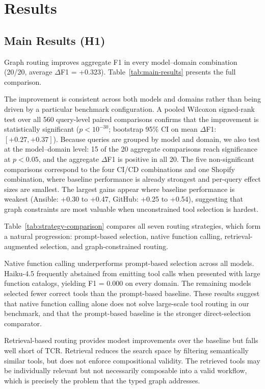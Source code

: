 \section{Results}
\label{sec:results}

\subsection{Main Results (H1)}
\label{sec:main-results}

Graph routing improves aggregate F1 in every model--domain combination (20/20, average $\Delta$F1 = +0.323).
Table~\ref{tab:main-results} presents the full comparison.



The improvement is consistent across both models and domains rather than being driven by a particular benchmark configuration.
A pooled Wilcoxon signed-rank test over all 560 query-level paired comparisons confirms that the improvement is statistically significant ($p < 10^{-30}$; bootstrap 95\% CI on mean $\Delta$F1: $[+0.27, +0.37]$).
Because queries are grouped by model and domain, we also test at the model--domain level: 15 of the 20 aggregate comparisons reach significance at $p < 0.05$, and the aggregate $\Delta$F1 is positive in all 20.
The five non-significant comparisons correspond to the four CI/CD combinations and one Shopify combination, where baseline performance is already strongest and per-query effect sizes are smallest.
The largest gains appear where baseline performance is weakest (Ansible: +0.30 to +0.47, GitHub: +0.25 to +0.54), suggesting that graph constraints are most valuable when unconstrained tool selection is hardest.

Table~\ref{tab:strategy-comparison} compares all seven routing strategies, which form a natural progression: prompt-based selection, native function calling, retrieval-augmented selection, and graph-constrained routing.

Native function calling underperforms prompt-based selection across all models.
Haiku-4.5 frequently abstained from emitting tool calls when presented with large function catalogs, yielding F1 = 0.000 on every domain.
The remaining models selected fewer correct tools than the prompt-based baseline.
These results suggest that native function calling alone does not solve large-scale tool routing in our benchmark, and that the prompt-based baseline is the stronger direct-selection comparator.

Retrieval-based routing provides modest improvements over the baseline but falls well short of TCR.
Retrieval reduces the search space by filtering semantically similar tools, but does not enforce compositional validity.
The retrieved tools may be individually relevant but not necessarily composable into a valid workflow, which is precisely the problem that the typed graph addresses.

